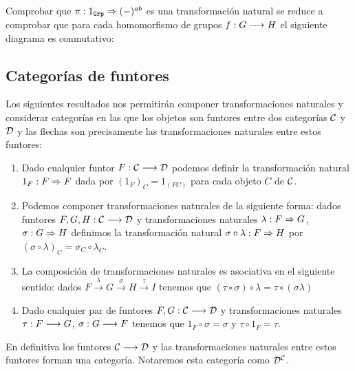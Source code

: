 Comprobar que $\pi: 1_{\texttt{Grp}}\Rightarrow (-)^{ab}$ es una transformación natural
se reduce a comprobar que para cada homomorfismo de grupos
$f: G\longrightarrow H$ el siguiente diagrama es conmutativo:
\begin{center}
\end{center}

\subsection{Categorías de funtores}
Los siguientes resultados nos permitirán componer
transformaciones naturales y considerar categorías en las
que los objetos son funtores entre dos categorías $\mathcal{C}$ y $\mathcal{D}$ y las
flechas son precisamente
las transformaciones naturales entre estos funtores:

\begin{proposition}
  \begin{enumerate}
  \item Dado cualquier funtor $F : \mathcal{C}\longrightarrow \mathcal{D}$ podemos definir
    la transformación natural $1_F : F\Rightarrow F$ dada por
    ${(1_F)}_C = 1_{(FC)}$
    para cada objeto $C$ de $\mathcal{C}$.
  \item Podemos componer transformaciones naturales de la siguiente
    forma: dados funtores $F, G, H : \mathcal{C}\longrightarrow \mathcal{D}$ y transformaciones
    naturales $\lambda : F\Rightarrow G$, $\sigma : G\Rightarrow H$
    definimos la transformación natural
    $\sigma \circ \lambda : F\Rightarrow H$ por
    $(\sigma\circ\lambda)_C = \sigma_C \circ \lambda_C$.
  \item La composición de transformaciones naturales
    es asociativa en el siguiente sentido: dados
    $F \xrightarrow{\lambda} G \xrightarrow{\sigma} H \xrightarrow{\tau}I$
    tenemos que $(\tau \circ \sigma) \circ \lambda = \tau \circ (\sigma \lambda)$
  \item Dado cualquier par de funtores $F,G : \mathcal{C}\longrightarrow \mathcal{D}$ y
    transformaciones naturales $\tau : F\longrightarrow G$,
    $\sigma : G\longrightarrow F$ tenemos que $1_F \circ \sigma = \sigma$
    y $\tau \circ 1_F = \tau$.
  \end{enumerate}

  En definitiva los funtores $\mathcal{C}\longrightarrow \mathcal{D}$ y las transformaciones
  naturales entre estos funtores forman una categoría. Notaremos
  esta categoría
  como $\mathcal{D}^{\mathcal{C}}$.
\end{proposition}

